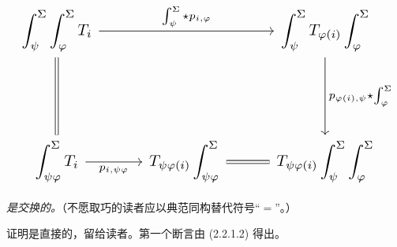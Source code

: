 \begin{equation*}
  \resizebox{\textwidth}{!}{%
    $\begin{tikzcd}[ampersand replacement=\&,column sep=2.8em,row sep=5.0em]
      \displaystyle\int_\psi^\Sigma\int_\varphi^\Sigma T_i
        \arrow[rr,"{\int_\psi^\Sigma\star p_{i,\varphi}}"]
        \arrow[d,equal]
        \& {}
        \& \displaystyle\int_\psi^\Sigma T_{\varphi(i)}\int_\varphi^\Sigma
          \arrow[d,"{p_{\varphi(i),\psi}\star\int_\varphi^\Sigma}"] \\
      \displaystyle\int_{\psi\varphi}^\Sigma T_i
        \arrow[r,"{p_{i,\psi\varphi}}"']
        \& \displaystyle T_{\psi\varphi(i)}\int_{\psi\varphi}^\Sigma
          \arrow[r,equal]
        \& \displaystyle T_{\psi\varphi(i)}\int_\psi^\Sigma\int_\varphi^\Sigma
    \end{tikzcd}$%
  }
\end{equation*}

\emph{是交换的。}（不愿取巧的读者应以典范同构替代符号“$=$”。）

证明是直接的，留给读者。第一个断言由 (2.2.1.2) 得出。
